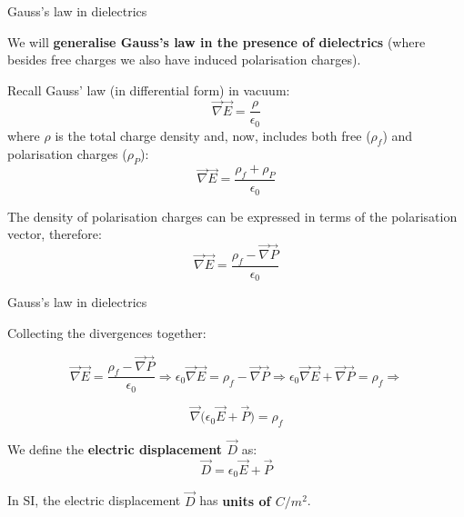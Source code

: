 %
%
%

\begin{frame}{Gauss's law in dielectrics}

We will {\bf generalise Gauss's law in the presence of dielectrics}
(where besides free charges we also have induced polarisation charges).\\

\vspace{0.2cm}

Recall Gauss' law (in differential form) in vacuum:
\begin{equation*}
   \vec{\nabla} \vec{E} = \frac{\rho}{\epsilon_0}
\end{equation*}
where $\rho$ is the total charge density and, now, includes both free ($\rho_f$) and polarisation charges ($\rho_P$):
\begin{equation*}
   \vec{\nabla} \vec{E} = \frac{\rho_f + \rho_P}{\epsilon_0}
\end{equation*}

The density of polarisation charges can be expressed in terms of the polarisation vector, therefore:
\begin{equation*}
   \vec{\nabla} \vec{E} = \frac{\rho_f - \vec{\nabla}\vec{P}}{\epsilon_0}
\end{equation*}

\end{frame}

%
%
%

\begin{frame}{Gauss's law in dielectrics}


Collecting the divergences together:

\begin{equation*}
   \vec{\nabla} \vec{E} = \frac{\rho_f - \vec{\nabla}\vec{P}}{\epsilon_0} \Rightarrow
   \epsilon_0 \vec{\nabla} \vec{E} = \rho_f - \vec{\nabla}\vec{P} \Rightarrow
   \epsilon_0 \vec{\nabla} \vec{E} + \vec{\nabla}\vec{P} = \rho_f \Rightarrow
\end{equation*}

\begin{equation*}
   \vec{\nabla} \Big( \epsilon_0 \vec{E} + \vec{P} \Big) = \rho_f
\end{equation*}

We define the {\bf electric displacement $\vec{D}$} as:
\begin{equation*}
   \vec{D} = \epsilon_0 \vec{E} + \vec{P}
\end{equation*}

In SI, the electric displacement $\vec{D}$ has {\bf units of $C/m^2$}.

\end{frame}

